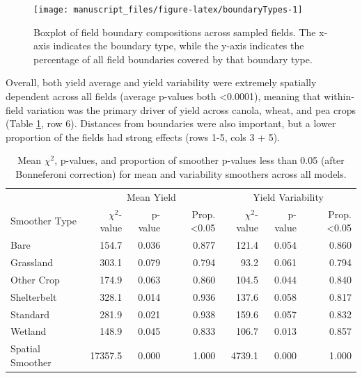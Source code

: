 \documentclass[]{elsarticle} %
\begin{document}
\begin{figure}
\texttt{[image: manuscript\_files/figure-latex/boundaryTypes-1]} \caption{Boxplot of field boundary compositions across sampled fields. The x-axis indicates the boundary type, while the y-axis indicates the percentage of all field boundaries covered by that boundary type.}\label{fig:boundaryTypes}
\end{figure}

Overall, both yield average and yield variability were extremely spatially dependent across all fields (average p-values both \textless0.0001), meaning that within-field variation was the primary driver of yield across canola, wheat, and pea crops (Table \ref{tab:smoothSummary}, row 6).
Distances from boundaries were also important, but a lower proportion of the fields had strong effects (rows 1-5, cols 3 + 5).

\begin{table}

\caption{\label{tab:smoothSummary}Mean $\chi^2$, p-values, and proportion of smoother p-values less than 0.05 (after Bonneferoni correction) for mean and variability smoothers across all models.}
\centering
\begin{tabular}[t]{l|r|r|r|r|r|r}
\hline
\multicolumn{1}{c|}{} & \multicolumn{3}{c|}{Mean Yield} & \multicolumn{3}{c}{Yield Variability} \\
\cline{2-4} \cline{5-7}
Smoother Type & $\chi^2$-value & p-value & Prop. <0.05 & $\chi^2$-value & p-value & Prop. <0.05\\
\hline
Bare & 154.7 & 0.036 & 0.877 & 121.4 & 0.054 & 0.860\\
\hline
Grassland & 303.1 & 0.079 & 0.794 & 93.2 & 0.061 & 0.794\\
\hline
Other Crop & 174.9 & 0.063 & 0.860 & 104.5 & 0.044 & 0.840\\
\hline
Shelterbelt & 328.1 & 0.014 & 0.936 & 137.6 & 0.058 & 0.817\\
\hline
Standard & 281.9 & 0.021 & 0.938 & 159.6 & 0.057 & 0.832\\
\hline
Wetland & 148.9 & 0.045 & 0.833 & 106.7 & 0.013 & 0.857\\
\hline
Spatial Smoother & 17357.5 & 0.000 & 1.000 & 4739.1 & 0.000 & 1.000\\
\hline
\end{tabular}
\end{table}
\end{document}
